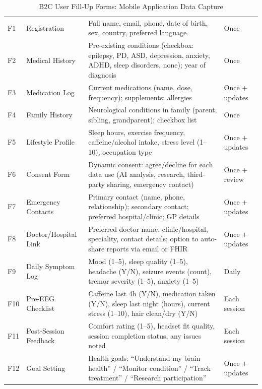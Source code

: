 {\tablestripes\tablefontsize

\begin{xltabular}{\textwidth}{@{} >{\raggedright\arraybackslash}p{1.0cm} >{\raggedright\arraybackslash}p{3.4cm} p{8.3cm} >{\raggedright\arraybackslash}p{1.5cm} @{}}
\caption[B2C User Fill-Up Forms]{B2C User Fill-Up Forms: Mobile Application Data Capture}\label{tab:b2c_user_forms} \\
\toprule
\thead{\#} &  &  &  \\
\midrule
\endfirsthead
\endhead
\bottomrule
\endlastfoot
F1 & Registration & Full name, email, phone, date of birth, sex, country, preferred language & Once \\
\addlinespace
F2 & Medical History & Pre-existing conditions (checkbox: epilepsy, PD, ASD, depression, anxiety, ADHD, sleep disorders, none); year of diagnosis & Once \\
\addlinespace
F3 & Medication Log & Current medications (name, dose, frequency); supplements; allergies & Once + updates \\
\addlinespace
F4 & Family History & Neurological conditions in family (parent, sibling, grandparent); checkbox list & Once \\
\addlinespace
F5 & Lifestyle Profile & Sleep hours, exercise frequency, caffeine/alcohol intake, stress level (1--10), occupation type & Once + updates \\
\addlinespace
F6 & Consent Form & Dynamic consent: agree/decline for each data use (AI analysis, research, third-party sharing, emergency contact) & Once + review \\
\addlinespace
F7 & Emergency Contacts & Primary contact (name, phone, relationship); secondary contact; preferred hospital/clinic; GP details & Once + updates \\
\addlinespace
F8 & Doctor/Hospital Link & Preferred doctor name, clinic/hospital, speciality, contact details; option to auto-share reports via email or FHIR & Once + updates \\
\addlinespace
F9 & Daily Symptom Log & Mood (1--5), sleep quality (1--5), headache (Y/N), seizure events (count), tremor severity (1--5), anxiety (1--5) & Daily \\
\addlinespace
F10 & Pre-EEG Checklist & Caffeine last 4h (Y/N), medication taken (Y/N), sleep last night (hours), current stress (1--10), hair clean/dry (Y/N) & Each session \\
\addlinespace
F11 & Post-Session Feedback & Comfort rating (1--5), headset fit quality, session completion status, any issues noted & Each session \\
\addlinespace
F12 & Goal Setting & Health goals: ``Understand my brain health'' / ``Monitor condition'' / ``Track treatment'' / ``Research participation'' & Once + updates \\
\end{xltabular}}
